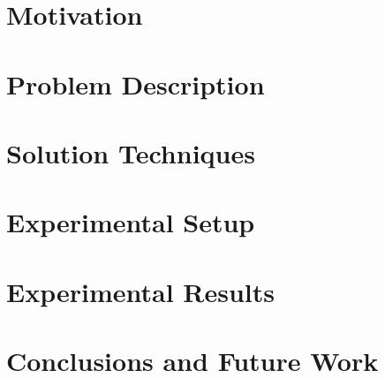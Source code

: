 \documentclass[12pt,conference]{IEEEtran}
\begin{document}
\section{Motivation}

\section{Problem Description}

\section{Solution Techniques}

\section{Experimental Setup}

\section{Experimental Results}

\section{Conclusions and Future Work}

\begin{thebibliography}{1}
\end{thebibliography}
\end{document}
